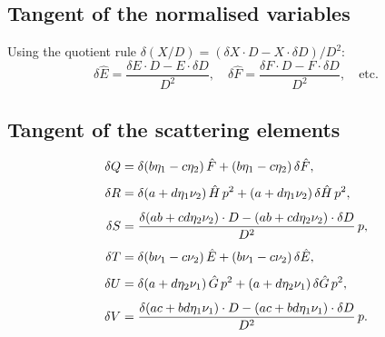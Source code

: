 \documentclass[11pt,a4paper]{article}
\theoremstyle{plain}
\theoremstyle{remark}
\begin{document}
\subsection{Tangent of the normalised variables}

Using the quotient rule $\delta(X/D) = (\delta X\cdot D - X\cdot\delta D)/D^2$:
\begin{equation}\label{eq:dhat}
  \delta\hat{E} = \frac{\delta E\cdot D - E\cdot\delta D}{D^2},
  \quad
  \delta\hat{F} = \frac{\delta F\cdot D - F\cdot\delta D}{D^2},
  \quad\text{etc.}
\end{equation}

\subsection{Tangent of the scattering elements}\label{sec:tl-scat-elem}

\begin{align}
  \delta Q &= \delta(b\eta_1 - c\eta_2)\,\hat{F}
            + (b\eta_1 - c\eta_2)\,\delta\hat{F},
  \label{eq:dQ}\\[4pt]
  \delta R &= \delta(a + d\eta_1\nu_2)\,\hat{H}\,p^2
            + (a + d\eta_1\nu_2)\,\delta\hat{H}\,p^2,
  \label{eq:dR-scat}\\[4pt]
  \delta S &= \frac{%
    \delta(ab + cd\eta_2\nu_2)\cdot D
    - (ab + cd\eta_2\nu_2)\cdot\delta D
  }{D^2}\,p,
  \label{eq:dS}\\[4pt]
  \delta T &= \delta(b\nu_1 - c\nu_2)\,\hat{E}
            + (b\nu_1 - c\nu_2)\,\delta\hat{E},
  \label{eq:dT-scat}\\[4pt]
  \delta U &= \delta(a + d\eta_2\nu_1)\,\hat{G}\,p^2
            + (a + d\eta_2\nu_1)\,\delta\hat{G}\,p^2,
  \label{eq:dU-scat}\\[4pt]
  \delta V &= \frac{%
    \delta(ac + bd\eta_1\nu_1)\cdot D
    - (ac + bd\eta_1\nu_1)\cdot\delta D
  }{D^2}\,p.
  \label{eq:dV}
\end{align}
\end{document}
